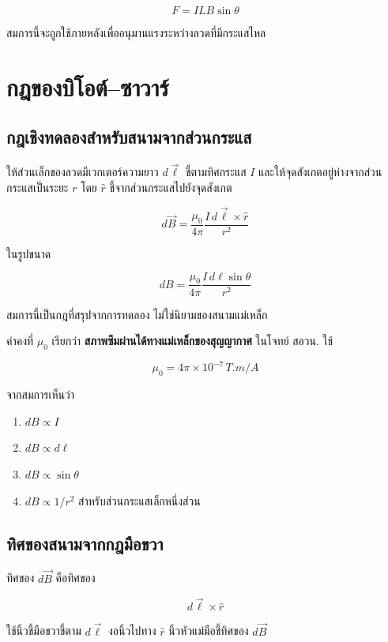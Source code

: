 \[
\boxed{F=ILB\sin\theta}
\]

สมการนี้จะถูกใช้ภายหลังเพื่ออนุมานแรงระหว่างลวดที่มีกระแสไหล

\section{กฎของบิโอต์--ซาวาร์}

\subsection{กฎเชิงทดลองสำหรับสนามจากส่วนกระแส}

ให้ส่วนเล็กของลวดมีเวกเตอร์ความยาว $d\vec{\ell}$ ชี้ตามทิศกระแส $I$ และให้จุดสังเกตอยู่ห่างจากส่วนกระแสเป็นระยะ $r$ โดย $\hat{r}$ ชี้จากส่วนกระแสไปยังจุดสังเกต

\begin{tcolorbox}[title={กฎของบิโอต์--ซาวาร์}]
\[
\boxed{
 d\vec{B}
 =
 \frac{\mu_0}{4\pi}
 \frac{I\,d\vec{\ell}\times\hat{r}}{r^2}}
\]

ในรูปขนาด

\[
\boxed{
 dB
 =
 \frac{\mu_0}{4\pi}
 \frac{I\,d\ell\sin\theta}{r^2}}
\]
\end{tcolorbox}

สมการนี้เป็นกฎที่สรุปจากการทดลอง ไม่ใช่นิยามของสนามแม่เหล็ก

ค่าคงที่ $\mu_0$ เรียกว่า \textbf{สภาพซึมผ่านได้ทางแม่เหล็กของสุญญากาศ} ในโจทย์ สอวน. ใช้

\[
\boxed{
\mu_0=4\pi\times10^{-7}\,\si{T.m/A}}
\]

จากสมการเห็นว่า

\begin{enumerate}
    \item $dB\propto I$
    \item $dB\propto d\ell$
    \item $dB\propto \sin\theta$
    \item $dB\propto 1/r^2$ สำหรับส่วนกระแสเล็กหนึ่งส่วน
\end{enumerate}

\subsection{ทิศของสนามจากกฎมือขวา}

ทิศของ $d\vec{B}$ คือทิศของ

\[
d\vec{\ell}\times\hat{r}
\]

ใช้นิ้วชี้มือขวาชี้ตาม $d\vec{\ell}$ งอนิ้วไปทาง $\hat{r}$ นิ้วหัวแม่มือชี้ทิศของ $d\vec{B}$

